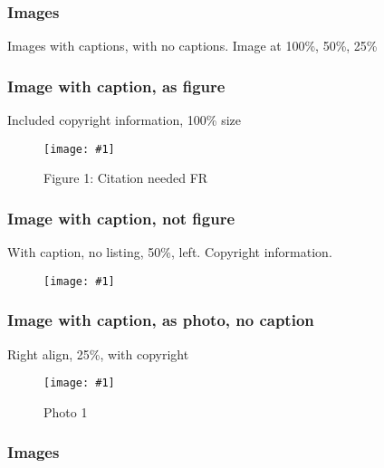 \documentclass{article}
\newlength{\imgwidth}
\newcommand\scaledgraphics[2]{%
                
\settowidth{\imgwidth}{\texttt{[image: \#1]}}%
                
\setlength{\imgwidth}{\minof{\imgwidth}{#2\textwidth}}%
                
\texttt{[image: \#1]}%
                
}
\begin{document}
\subsubsection{Images}\label{H607067}



Images with captions, with no captions. Image at 100\%, 50\%, 25\%


\subsubsection{Image with caption, as figure}\label{H415836}



Included copyright information, 100\% size

\begin{figure}
\scaledgraphics{6fcd536f-7b25-4706-ba4e-aef280055634.jpg}{1}
\caption*{Figure 1: Citation needed FR}\label{F27135281}
\end{figure}


\subsubsection{Image with caption, not figure}\label{H9577977}



With caption, no listing, 50\%, left. Copyright information.

\begin{wrapfigure}{l}{0.5\textwidth}
\scaledgraphics{63e9e3b9-9635-4931-b968-b27c31dfebe1.jpg}{0.5}
\label{F35988861}
\end{wrapfigure}


\subsubsection{Image with caption, as photo, no caption}\label{H166321}



Right align, 25\%, with copyright

\begin{wrapfigure}{r}{0.25\textwidth}
\scaledgraphics{c257c489-b841-4e89-aa1f-5f0fd3ddee69.png}{0.25}
\caption*{Photo 1}\label{F40137711}
\end{wrapfigure}


\subsubsection{Images}\label{H1357540}
\end{document}
